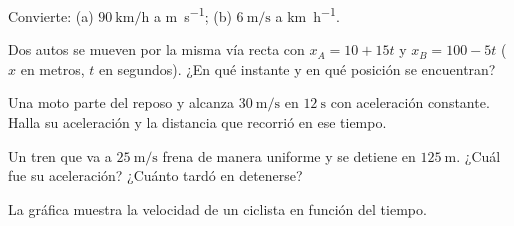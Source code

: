 \documentclass[11pt,a4paper]{article}
\begin{document}
\taller
\begin{ejercicios}
\item Convierte: (a) $\SI{90}{\kilo\meter\per\hour}$ a \si{\meter\per\second}; (b) $\SI{6}{\meter\per\second}$ a
  \si{\kilo\meter\per\hour}.
\item Dos autos se mueven por la misma vía recta con $x_A=10+15t$ y $x_B=100-5t$ ($x$ en metros, $t$ en segundos).
  ¿En qué instante y en qué posición se encuentran?
\item Una moto parte del reposo y alcanza $\SI{30}{\meter\per\second}$ en $\SI{12}{\second}$ con aceleración constante.
  Halla su aceleración y la distancia que recorrió en ese tiempo.
\item Un tren que va a $\SI{25}{\meter\per\second}$ frena de manera uniforme y se detiene en $\SI{125}{\meter}$.
  ¿Cuál fue su aceleración? ¿Cuánto tardó en detenerse?
\item La gráfica muestra la velocidad de un ciclista en función del tiempo.


\end{ejercicios}
\end{document}
